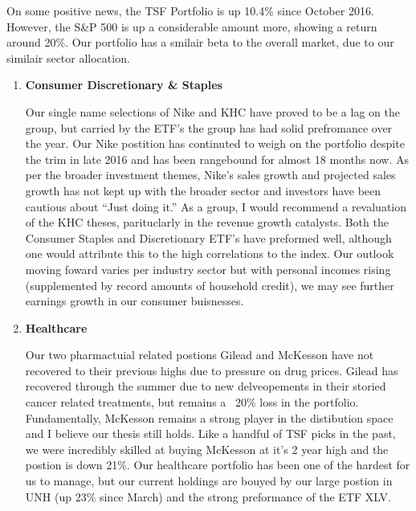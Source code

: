 \documentclass[11pt,pressrelease]{newlfm} %
\begin{document}
\begin{newlfm}


\begin{singlespace} 		%
On some positive news, the TSF Portfolio is up 10.4\% since October 2016. However, the S\&P 500 is up a considerable amount more, showing a return around 20\%. Our portfolio has a smilair beta to the overall market, due to our similair sector allocation. 

\begin{enumerate}
\item \textbf{Consumer Discretionary \& Staples} \par
Our single name selections of Nike and KHC have proved to be a lag on the group, but carried by the ETF's the group has had solid prefromance over the year.
Our Nike postition has continuted to weigh on the portfolio despite the trim in late 2016 and has been rangebound for almost 18 months now. As per the broader investment themes, Nike's sales growth and projected sales growth has not kept up with the broader sector and investors have been cautious about ``Just doing it.'' As a group, I would recommend a revaluation of the KHC theses, parituclarly in the revenue growth catalysts. Both the Consumer Staples and Discretionary ETF’s have preformed well, although one would attribute this to the high correlations to the index. Our outlook moving foward varies per industry sector but with personal incomes rising (supplemented by record amounts of household credit), we may see further earnings growth in our consumer buisnesses. %


\item \textbf{Healthcare} \par
Our two pharmactuial related postions Gilead and McKesson have not recovered to their previous highs due to pressure on drug prices. Gilead has recovered through the summer due to new delveopements in their storied cancer related treatments, but remains a ~20\% loss in the portfolio. Fundamentally, McKesson remains a strong player in the distibution space and I believe our thesis still holds. Like a handful of TSF picks in the past, we were incredibly skilled at buying McKesson at it's 2 year high and the postion is down 21\%. Our healthcare portfolio has been one of the hardest for us to manage, but our   current holdings are bouyed by our large postion in UNH (up 23\% since March) and the strong preformance of the ETF XLV.


\end{enumerate}
\end{singlespace}
\end{newlfm}
\end{document}
